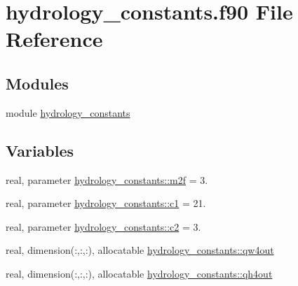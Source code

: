 \hypertarget{hydrology__constants_8f90}{}\section{hydrology\+\_\+constants.\+f90 File Reference}
\label{hydrology__constants_8f90}
\subsection*{Modules}
\begin{DoxyCompactItemize}
\item 
module \hyperlink{namespacehydrology__constants}{hydrology\+\_\+constants}
\end{DoxyCompactItemize}
\subsection*{Variables}
\begin{DoxyCompactItemize}
\item 
real, parameter \hyperlink{namespacehydrology__constants_ab490db8c3db1149de2c3a999ca405462}{hydrology\+\_\+constants\+::m2f} = 3.
\item 
real, parameter \hyperlink{namespacehydrology__constants_aab37efe722e2cb3021d692662a4f71be}{hydrology\+\_\+constants\+::c1} = 21.
\item 
real, parameter \hyperlink{namespacehydrology__constants_af41d19dbcc0f506fe98fcd9d081ee8d9}{hydrology\+\_\+constants\+::c2} = 3.
\item 
real, dimension(\+:,\+:,\+:), allocatable \hyperlink{namespacehydrology__constants_a4a968142e8621f39c2e739983340bb25}{hydrology\+\_\+constants\+::qw4out}
\item 
real, dimension(\+:,\+:,\+:), allocatable \hyperlink{namespacehydrology__constants_aab3e1ed337a2f4bb8ac1ae647b9ebd65}{hydrology\+\_\+constants\+::qh4out}
\end{DoxyCompactItemize}
